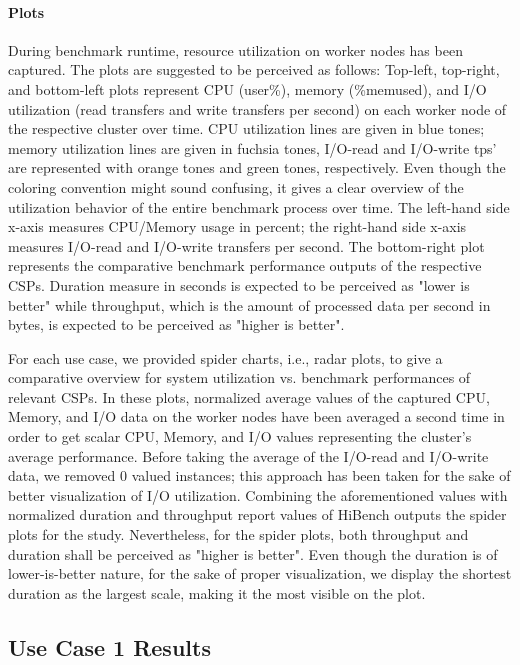 \documentclass[review]{elsarticle}
\begin{document}
\paragraph{Plots}During benchmark runtime, resource utilization on worker nodes has been captured. The plots are suggested to be perceived as follows: Top-left, top-right, and bottom-left plots represent CPU (user\%), memory (\%memused), and I/O utilization (read transfers and write transfers per second) on each worker node of the respective cluster over time. CPU utilization lines are given in blue tones; memory utilization lines are given in fuchsia tones, I/O-read and I/O-write tps' are represented with orange tones and green tones, respectively. Even though the coloring convention might sound confusing, it gives a clear overview of the utilization behavior of the entire benchmark process over time. The left-hand side x-axis measures CPU/Memory usage in percent; the right-hand side x-axis measures I/O-read and I/O-write transfers per second. The bottom-right plot represents the comparative benchmark performance outputs of the respective CSPs. Duration measure in seconds is expected to be perceived as "lower is better" while throughput, which is the amount of processed data per second in bytes, is expected to be perceived as "higher is better".

For each use case, we provided spider charts, i.e., radar plots, to give a comparative overview for system utilization vs. benchmark performances of relevant CSPs. In these plots, normalized average values of the captured CPU, Memory, and I/O data on the worker nodes have been averaged a second time in order to get scalar CPU, Memory, and I/O values representing the cluster's average performance. Before taking the average of the I/O-read and I/O-write data, we removed 0 valued instances; this approach has been taken for the sake of better visualization of I/O utilization. Combining the aforementioned values with normalized duration and throughput report values of HiBench outputs the spider plots for the study. Nevertheless, for the spider plots, both throughput and duration shall be perceived as "higher is better". Even though the duration is of lower-is-better nature, for the sake of proper visualization, we display the shortest duration as the largest scale, making it the most visible on the plot. 


\subsection{Use Case 1 Results}
\end{document}
